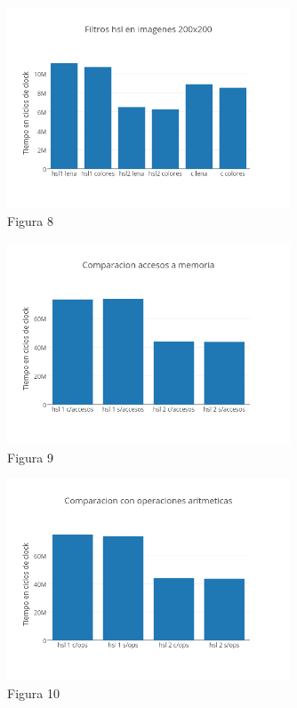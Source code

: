 \documentclass[a4paper]{article}
\begin{document}
\begin{figure}[h]
  \centering
    \includegraphics[width=0.75\textwidth]{imagenes/Filtros hsl en imagenes 200x200.png}
  \caption{Figura 8}
  \label{fig:graficohsl2}
\end{figure}
 \FloatBarrier

\begin{figure}[h]
  \centering
    \includegraphics[width=0.75\textwidth]{imagenes/Comparacion accesos a memoria hsl colores.png}
  \caption{Figura 9}
  \label{fig:graficohsl3}
\end{figure}
 \FloatBarrier

\begin{figure}[h]
  \centering
    \includegraphics[width=0.75\textwidth]{imagenes/Comparacion con operaciones aritmeticas hsl colores.png}
  \caption{Figura 10}
  \label{fig:graficohsl4}
\end{figure}
 \FloatBarrier
\end{document}
